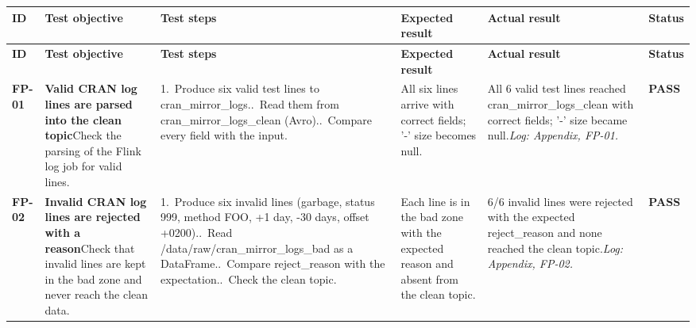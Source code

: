 {\footnotesize
\begin{longtable}{@{}L{1.1cm}L{5.8cm}L{5.4cm}L{3.9cm}L{5.5cm}L{1.3cm}@{}}
\toprule
\textbf{ID} & \textbf{Test objective} & \textbf{Test steps} & \textbf{Expected result} & \textbf{Actual result} & \textbf{Status} \\
\midrule
\endfirsthead
\toprule
\textbf{ID} & \textbf{Test objective} & \textbf{Test steps} & \textbf{Expected result} & \textbf{Actual result} & \textbf{Status} \\
\midrule
\endhead
\bottomrule
\endfoot
\textbf{FP-01} & \textbf{Valid CRAN log lines are parsed into the clean topic}\newline Check the parsing of the Flink log job for valid lines. & 1.~Produce six valid test lines to cran\_\allowbreak{}mirror\_\allowbreak{}logs..~Read them from cran\_\allowbreak{}mirror\_\allowbreak{}logs\_\allowbreak{}clean (Avro)..~Compare every field with the input. & All six lines arrive with correct fields; '-' size becomes null. & All 6 valid test lines reached cran\_\allowbreak{}mirror\_\allowbreak{}logs\_\allowbreak{}clean with correct fields; '-' size became null.\newline \textit{Log: Appendix, FP-01.} & \textbf{\textcolor{green!45!black}{PASS}} \\
\midrule[0.3pt]
\textbf{FP-02} & \textbf{Invalid CRAN log lines are rejected with a reason}\newline Check that invalid lines are kept in the bad zone and never reach the clean data. & 1.~Produce six invalid lines (garbage, status 999, method FOO, +1 day, -30 days, offset +0200)..~Read /\allowbreak{}data/\allowbreak{}raw/\allowbreak{}cran\_\allowbreak{}mirror\_\allowbreak{}logs\_\allowbreak{}bad as a DataFrame..~Compare reject\_\allowbreak{}reason with the expectation..~Check the clean topic. & Each line is in the bad zone with the expected reason and absent from the clean topic. & 6/\allowbreak{}6 invalid lines were rejected with the expected reject\_\allowbreak{}reason and none reached the clean topic.\newline \textit{Log: Appendix, FP-02.} & \textbf{\textcolor{green!45!black}{PASS}} \\
\midrule[0.3pt]

\end{longtable}}
